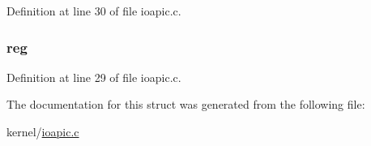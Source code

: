 Definition at line 30 of file ioapic.\-c.

\hypertarget{structioapic_a1705e7cf67054ce9923334e3d530fcd4}{
\subsubsection[{reg}]{ reg}}\label{structioapic_a1705e7cf67054ce9923334e3d530fcd4}


Definition at line 29 of file ioapic.\-c.



The documentation for this struct was generated from the following file\-:\begin{DoxyCompactItemize}
\item 
kernel/\hyperlink{ioapic_8c}{ioapic.\-c}\end{DoxyCompactItemize}
